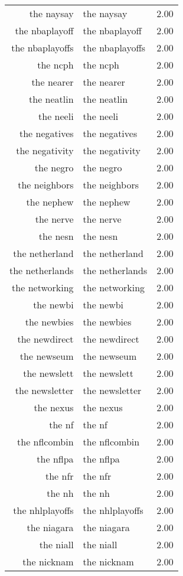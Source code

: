 \begin{table}[ht]
\begin{tabular}{rlr}
  the naysay & the naysay & 2.00 \\ 
  the nbaplayoff & the nbaplayoff & 2.00 \\ 
  the nbaplayoffs & the nbaplayoffs & 2.00 \\ 
  the ncph & the ncph & 2.00 \\ 
  the nearer & the nearer & 2.00 \\ 
  the neatlin & the neatlin & 2.00 \\ 
  the neeli & the neeli & 2.00 \\ 
  the negatives & the negatives & 2.00 \\ 
  the negativity & the negativity & 2.00 \\ 
  the negro & the negro & 2.00 \\ 
  the neighbors & the neighbors & 2.00 \\ 
  the nephew & the nephew & 2.00 \\ 
  the nerve & the nerve & 2.00 \\ 
  the nesn & the nesn & 2.00 \\ 
  the netherland & the netherland & 2.00 \\ 
  the netherlands & the netherlands & 2.00 \\ 
  the networking & the networking & 2.00 \\ 
  the newbi & the newbi & 2.00 \\ 
  the newbies & the newbies & 2.00 \\ 
  the newdirect & the newdirect & 2.00 \\ 
  the newseum & the newseum & 2.00 \\ 
  the newslett & the newslett & 2.00 \\ 
  the newsletter & the newsletter & 2.00 \\ 
  the nexus & the nexus & 2.00 \\ 
  the nf & the nf & 2.00 \\ 
  the nflcombin & the nflcombin & 2.00 \\ 
  the nflpa & the nflpa & 2.00 \\ 
  the nfr & the nfr & 2.00 \\ 
  the nh & the nh & 2.00 \\ 
  the nhlplayoffs & the nhlplayoffs & 2.00 \\ 
  the niagara & the niagara & 2.00 \\ 
  the niall & the niall & 2.00 \\ 
  the nicknam & the nicknam & 2.00 \\ 

\end{tabular}
\end{table}
